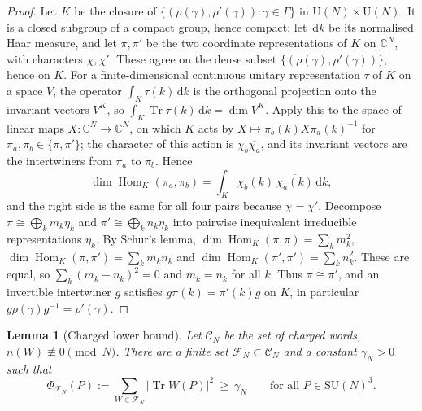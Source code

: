 \documentclass[11pt,a4paper]{amsart}
\newtheorem{lemma}[theorem]{Lemma}
\theoremstyle{definition}
\theoremstyle{remark}
\numberwithin{equation}{section}
\DeclareMathOperator{\Tr}{Tr}        %
\newcommand{\C}{\mathbb{C}}          %
\newcommand{\abs}[1]{\lvert #1\rvert}      %
\newcommand{\dd}{\,\mathrm{d}}             %
\newcommand{\SU}{\mathrm{SU}}              %
\newcommand{\U}{\mathrm{U}}                %
\begin{document}
\begin{proof}
Let $K$ be the closure of $\{(\rho(\gamma),\rho'(\gamma)):\gamma\in\Gamma\}$ in $\U(N)\times\U(N)$. It is a closed subgroup of a compact group, hence compact; let $\dd k$ be its normalised Haar measure, and let $\pi,\pi'$ be the two coordinate representations of $K$ on $\C^N$, with characters $\chi,\chi'$. These agree on the dense subset $\{(\rho(\gamma),\rho'(\gamma))\}$, hence on $K$. For a finite-dimensional continuous unitary representation $\tau$ of $K$ on a space $V$, the operator $\int_K\tau(k)\dd k$ is the orthogonal projection onto the invariant vectors $V^K$, so $\int_K\Tr\tau(k)\dd k=\dim V^K$. Apply this to the space of linear maps $X:\C^N\to\C^N$, on which $K$ acts by $X\mapsto\pi_b(k)X\pi_a(k)^{-1}$ for $\pi_a,\pi_b\in\{\pi,\pi'\}$; the character of this action is $\chi_b\overline{\chi_a}$, and its invariant vectors are the intertwiners from $\pi_a$ to $\pi_b$. Hence
\[
\dim\operatorname{Hom}_K(\pi_a,\pi_b)=\int_K\chi_b(k)\,\overline{\chi_a(k)}\dd k ,
\]
and the right side is the same for all four pairs because $\chi=\chi'$. Decompose $\pi\cong\bigoplus_km_k\eta_k$ and $\pi'\cong\bigoplus_kn_k\eta_k$ into pairwise inequivalent irreducible representations $\eta_k$. By Schur's lemma, $\dim\operatorname{Hom}_K(\pi,\pi)=\sum_km_k^2$, $\dim\operatorname{Hom}_K(\pi,\pi')=\sum_km_kn_k$ and $\dim\operatorname{Hom}_K(\pi',\pi')=\sum_kn_k^2$. These are equal, so $\sum_k(m_k-n_k)^2=0$ and $m_k=n_k$ for all $k$. Thus $\pi\cong\pi'$, and an invertible intertwiner $g$ satisfies $g\pi(k)=\pi'(k)g$ on $K$, in particular $g\rho(\gamma)g^{-1}=\rho'(\gamma)$.
\end{proof}

\begin{lemma}[Charged lower bound]
Let $\mathcal{C}_N$ be the set of charged words, $n(W)\not\equiv0\pmod N$. There are a finite set $\mathcal{F}_N\subset\mathcal{C}_N$ and a constant $\gamma_N>0$ such that
\begin{equation}\label{eq:lw-charged-bound}
\Phi_{\mathcal{F}_N}(P):=\sum_{W\in\mathcal{F}_N}\abs{\Tr W(P)}^2\ \ge\ \gamma_N\qquad\text{for all }P\in\SU(N)^3 .
\end{equation}
\end{lemma}
\end{document}
